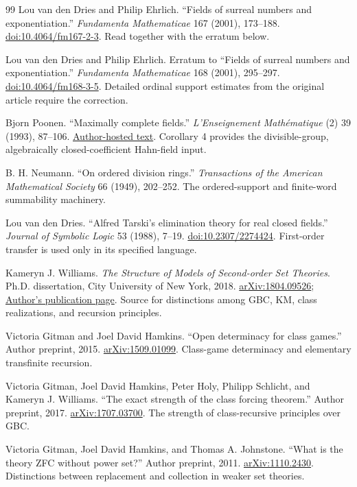\documentclass[11pt,letterpaper]{article}
\numberwithin{equation}{section}
\theoremstyle{definition}
\theoremstyle{remark}
\begin{document}
\begin{thebibliography}{99}
Lou van den Dries and Philip Ehrlich. ``Fields of surreal numbers and exponentiation.'' \emph{Fundamenta Mathematicae} 167 (2001), 173--188.
\href{https://doi.org/10.4064/fm167-2-3}{doi:10.4064/fm167-2-3}. Read together with the erratum below.

Lou van den Dries and Philip Ehrlich. Erratum to ``Fields of surreal numbers and exponentiation.'' \emph{Fundamenta Mathematicae} 168 (2001), 295--297.
\href{https://doi.org/10.4064/fm168-3-5}{doi:10.4064/fm168-3-5}. Detailed ordinal support estimates from the original article require the correction.

Bjorn Poonen. ``Maximally complete fields.'' \emph{L'Enseignement Math\'ematique} (2) 39 (1993), 87--106.
\href{https://math.mit.edu/~poonen/papers/amsval.pdf}{Author-hosted text}. Corollary 4 provides the divisible-group, algebraically closed-coefficient Hahn-field input.

B. H. Neumann. ``On ordered division rings.'' \emph{Transactions of the American Mathematical Society} 66 (1949), 202--252. The ordered-support and finite-word summability machinery.

Lou van den Dries. ``Alfred Tarski's elimination theory for real closed fields.'' \emph{Journal of Symbolic Logic} 53 (1988), 7--19.
\href{https://doi.org/10.2307/2274424}{doi:10.2307/2274424}. First-order transfer is used only in its specified language.

Kameryn J. Williams. \emph{The Structure of Models of Second-order Set Theories}. Ph.D. dissertation, City University of New York, 2018.
\href{https://arxiv.org/abs/1804.09526}{arXiv:1804.09526};
\href{https://juliakw.net/research/pubs/diss/}{Author's publication page}. Source for distinctions among GBC, KM, class realizations, and recursion principles.

Victoria Gitman and Joel David Hamkins. ``Open determinacy for class games.'' Author preprint, 2015.
\href{https://arxiv.org/abs/1509.01099}{arXiv:1509.01099}. Class-game determinacy and elementary transfinite recursion.

Victoria Gitman, Joel David Hamkins, Peter Holy, Philipp Schlicht, and Kameryn J. Williams. ``The exact strength of the class forcing theorem.'' Author preprint, 2017.
\href{https://arxiv.org/abs/1707.03700}{arXiv:1707.03700}. The strength of class-recursive principles over GBC.

Victoria Gitman, Joel David Hamkins, and Thomas A. Johnstone. ``What is the theory ZFC without power set?'' Author preprint, 2011.
\href{https://arxiv.org/abs/1110.2430}{arXiv:1110.2430}. Distinctions between replacement and collection in weaker set theories.


\end{thebibliography}
\end{document}
